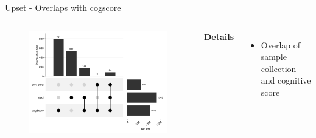 \begin{frame}{Upset - Overlaps with cogscore}
    \begin{columns}[c] %

    
        \begin{figure}
        \includegraphics[width=1\linewidth]{../figures/upset_score_stool.png}
        \end{figure}

    
        \textbf{Details}
        \begin{itemize}
            \item Overlap of sample collection and cognitive score
        \end{itemize}

    \end{columns}

\end{frame}

